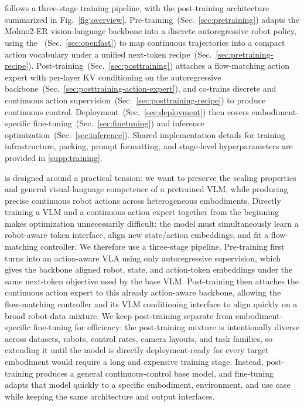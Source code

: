 \section{\molmoactt}
\label{sec:molmoact2}

\molmoactt follows a three-stage training pipeline, with the post-training architecture summarized in Fig.~\ref{fig:overview}. Pre-training~(Sec.~\ref{sec:pretraining}) adapts the Molmo2-ER vision-language backbone into a discrete autoregressive robot policy, using the \molmoactfast~(Sec.~\ref{sec:openfast}) to map continuous trajectories into a compact action vocabulary under a unified next-token recipe~(Sec.~\ref{sec:pretraining-recipe}). Post-training~(Sec.~\ref{sec:posttraining}) attaches a flow-matching action expert with per-layer KV conditioning on the autoregressive backbone~(Sec.~\ref{sec:posttraining-action-expert}), and co-trains discrete and continuous action supervision~(Sec.~\ref{sec:posttraining-recipe}) to produce continuous control. Deployment~(Sec.~\ref{sec:deployment}) then covers embodiment-specific fine-tuning~(Sec.~\ref{sec:finetuning}) and inference optimization~(Sec.~\ref{sec:inference}). Shared implementation details for training infrastructure, packing, prompt formatting, and stage-level hyperparameters are provided in \autoref{supp:training}.

\molmoactt is designed around a practical tension: we want to preserve the scaling properties and general visual-language competence of a pretrained VLM, while producing precise continuous robot actions across heterogeneous embodiments. Directly training a VLM and a continuous action expert together from the beginning makes optimization unnecessarily difficult: the model must simultaneously learn a robot-aware token interface, align new state/action embeddings, and fit a flow-matching controller. We therefore use a three-stage pipeline. Pre-training first turns \molmoer into an action-aware VLA using only autoregressive supervision, which gives the backbone aligned robot, state, and action-token embeddings under the same next-token objective used by the base VLM. Post-training then attaches the continuous action expert to this already action-aware backbone, allowing the flow-matching controller and its VLM conditioning interface to align quickly on a broad robot-data mixture. We keep post-training separate from embodiment-specific fine-tuning for efficiency: the post-training mixture is intentionally diverse across datasets, robots, control rates, camera layouts, and task families, so extending it until the model is directly deployment-ready for every target embodiment would require a long and expensive training stage. Instead, post-training produces a general continuous-control base model, and fine-tuning adapts that model quickly to a specific embodiment, environment, and use case while keeping the same architecture and output interfaces.





